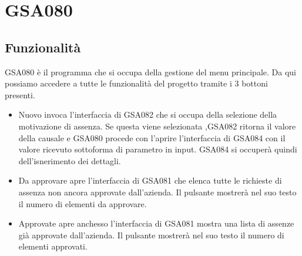 \documentclass[target=bach,aauheader=,style=]{thud}
\begin{document}
\section{GSA080}
\subsection{Funzionalità}
GSA080 è il programma che si occupa della gestione del menu principale. Da qui possiamo accedere a tutte le funzionalità del progetto tramite i 3 bottoni presenti.



\begin{itemize}
    \item Nuovo invoca l'interfaccia di GSA082 che si occupa della selezione della motivazione di assenza. 
    Se questa viene selezionata ,GSA082 ritorna il valore della causale e GSA080 procede con l'aprire l'interfaccia di GSA084 con il valore ricevuto sottoforma di parametro in input.
    GSA084 si occuperà quindi dell'isnerimento dei dettagli. 
        
    \item Da approvare apre l'interfaccia di GSA081 che elenca tutte le richieste di assenza non ancora approvate dall'azienda. Il pulsante mostrerà nel suo testo il numero di elementi da approvare.
    
    \item Approvate apre anchesso l'interfaccia di GSA081 mostra una lista di assenze già approvate dall'azienda. Il pulsante mostrerà nel suo testo il numero di elementi approvati.
\end{itemize}
\end{document}
